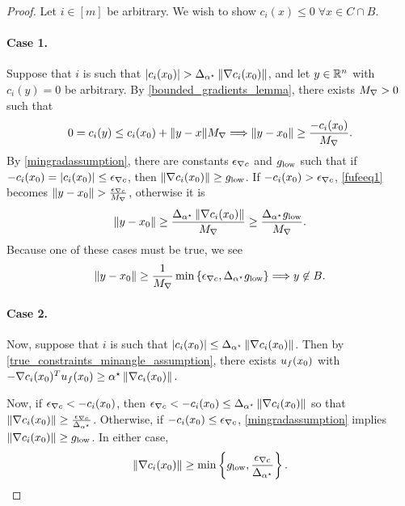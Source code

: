 \begin{proof}
Let $i \in [m]$ be arbitrary.
We wish to show $c_i\left(x\right) \le 0 \; \forall x \in C \cap B$.

\paragraph*{Case 1.}
Suppose that $i$ is such that $\left|c_i(x_0)\right| > {\Delta_{\alpha^{\star}}} \left\|\nabla c_i(x_0)\right\|$, and let $y \in \mathbb R^n$ with $c_i(y) = 0$ be arbitrary.
By \cref{bounded_gradients_lemma}, there exists ${M_{\nabla}} > 0$ such that
\begin{align}
\label{fufeeq1}
0 = c_i(y) \le c_i(x_0) + \|y - x\| {M_{\nabla}} \Longrightarrow \|y - x_0\| \ge \frac{-c_i(x_0)}{{M_{\nabla}}}.
\end{align}
By \cref{mingradassumption}, there are constants ${\epsilon_{\nabla c}}$ and ${ g_{\textrm{low}} }$ such that if $-c_i(x_0) = \left|c_i(x_0)\right| \le {\epsilon_{\nabla c}}$, then 
$\| \nabla c_i(x_0) \| \ge { g_{\textrm{low}} }$.
If $-c_i(x_0) > {\epsilon_{\nabla c}}$, \cref{fufeeq1} becomes $\|y - x_0\| > \frac{{\epsilon_{\nabla c}}}{{M_{\nabla}}}$, otherwise it is
\begin{align*}
\|y - x_0\| \ge \frac{{\Delta_{\alpha^{\star}}} \left\|\nabla c_i(x_0)\right\|}{{M_{\nabla}}} \ge \frac{{\Delta_{\alpha^{\star}}} { g_{\textrm{low}} }}{{M_{\nabla}}}.
\end{align*}
Because one of these cases must be true, we see
\begin{align*}
\|y - x_0\| \ge \frac 1 {{M_{\nabla}}}\min\left\{{\epsilon_{\nabla c}}, {\Delta_{\alpha^{\star}}} { g_{\textrm{low}} }\right\} \Longrightarrow y \not \in B.
\end{align*}

\paragraph*{Case 2.}
Now, suppose that $i$ is such that 
$\left|c_i(x_0)\right| \le {\Delta_{\alpha^{\star}}} \left\|\nabla c_i(x_0)\right\|$.
Then by \cref{true_constraints_minangle_assumption}, there exists ${u_{f}(x_0)}$ with
$-\nabla c_i(x_0)^T{u_{f}(x_0)} \ge { \alpha^{\star} } \left\| \nabla c_i(x_0) \right\|.$

Now, if ${\epsilon_{\nabla c}} < -c_i(x_0)$, then
${\epsilon_{\nabla c}} < -c_i(x_0) \le {\Delta_{\alpha^{\star}}} \left\|\nabla c_i(x_0)\right\|$
so that 
$\left\|\nabla c_i(x_0)\right\| \ge \frac{{\epsilon_{\nabla c}}}{{\Delta_{\alpha^{\star}}}}$.
Otherwise, if $-c_i(x_0) \le {\epsilon_{\nabla c}}$, \cref{mingradassumption} implies $\left\|\nabla c_i(x_0)\right\| \ge { g_{\textrm{low}} }$.
In either case, \begin{align}
\label{fufeeq2}
\left\|\nabla c_i(x_0)\right\| \ge \min\left\{{ g_{\textrm{low}} }, \frac{{\epsilon_{\nabla c}}}{{\Delta_{\alpha^{\star}}}}\right\}.
\end{align}


\end{proof}
